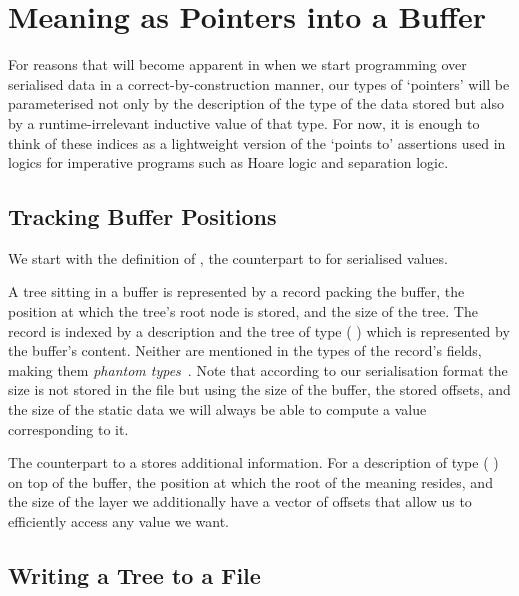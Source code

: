 \section{Meaning as Pointers into a Buffer}\label{sec:pointers}

For reasons that will become apparent in 
when we start programming over serialised data in a correct-by-construction
manner, our types of `pointers' will be parameterised not only
by the description of the type of the data stored but also by a
runtime-irrelevant inductive value of that type.
%
For now, it is enough to think of these indices as a lightweight
version of the `points to' assertions used in logics for imperative
programs such as Hoare logic and separation logic.

\subsection{Tracking Buffer Positions}

We start with the definition of ,
the counterpart to  for serialised values.


A tree sitting in a buffer is represented
by a record packing the buffer, the position at which the tree's
root node is stored, and the size of the tree.
%
The record is indexed by  a  description
and  the tree of type ( )
which is represented by the buffer's content.
Neither are mentioned in the types of the record's fields, making them
\emph{phantom types}~\citep{DBLP:conf/dsl/LeijenM99}.
%
Note that according to our serialisation format the size is not stored
in the file but using the size of the buffer, the stored offsets,
and the size of the static data we will always
be able to compute a value corresponding to it.


The counterpart to a  stores additional information.
%
For a description of type (   )
on top of the buffer, the position at which the root of the meaning resides,
and the size of the layer we additionally have a vector of  offsets
that allow us to efficiently access any value we want.

\subsection{Writing a Tree to a File}\label{sec:writetofile}


